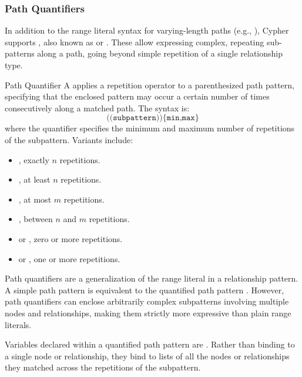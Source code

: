 \subsubsection{Path Quantifiers}

In addition to the range literal syntax for varying-length paths (e.g., \code{[:KNOWS*1..5]}), Cypher supports , also known as  or . These allow expressing complex, repeating sub-patterns along a path, going beyond simple repetition of a single relationship type.

\begin{definition}{Path Quantifier}
    A  applies a repetition operator to a parenthesized path pattern, specifying that the enclosed pattern may occur a certain number of times consecutively along a matched path. The syntax is:
    \[
    \texttt{((subpattern))\{min,max\}}
    \]
    where the quantifier  specifies the minimum and maximum number of repetitions of the subpattern. Variants include:
    \begin{itemize}
        \item {}, exactly $n$ repetitions.
        \item {}, at least $n$ repetitions.
        \item {}, at most $m$ repetitions.
        \item {}, between $n$ and $m$ repetitions.
        \item \code{\{*\}} or \code{*}, zero or more repetitions.
        \item \code{\{+\}} or \code{+}, one or more repetitions.
    \end{itemize}
\end{definition}

Path quantifiers are a generalization of the range literal in a relationship pattern. A simple path pattern \code{()-[:KNOWS*1..5]-()} is equivalent to the quantified path pattern . However, path quantifiers can enclose arbitrarily complex subpatterns involving multiple nodes and relationships, making them strictly more expressive than plain range literals.

Variables declared within a quantified path pattern are . Rather than binding to a single node or relationship, they bind to lists of all the nodes or relationships they matched across the repetitions of the subpattern.

